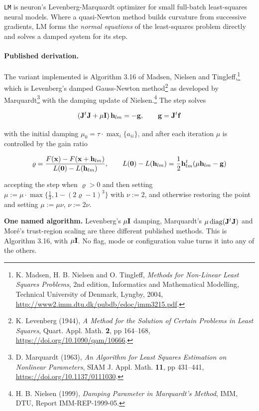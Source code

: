 \texttt{LM} is neuron's Levenberg-Marquardt optimizer for small full-batch
least-squares neural models.  Where a quasi-Newton method builds curvature from
successive gradients, LM forms the {\em normal equations} of the least-squares
problem directly and solves a damped system for its step.

\paragraph{Published derivation.}  The variant implemented is Algorithm 3.16 of
Madsen, Nielsen and Tingleff,\footnote{K. Madsen, H. B. Nielsen and O. Tingleff,
{\em Methods for Non-Linear Least Squares Problems}, 2nd edition, Informatics and
Mathematical Modelling, Technical University of Denmark, Lyngby, 2004,
\url{http://www2.imm.dtu.dk/pubdb/edoc/imm3215.pdf}.}
 which is Levenberg's
damped Gauss-Newton method\footnote{K. Levenberg (1944), {\em A Method for the
Solution of Certain Problems in Least Squares}, Quart. Appl. Math. {\bf 2}, pp
164--168, \url{https://doi.org/10.1090/qam/10666}.} as developed by
Marquardt\footnote{D. Marquardt (1963), {\em An
Algorithm for Least Squares Estimation on Nonlinear Parameters}, SIAM J. Appl.
Math. {\bf 11}, pp 431--441,
\url{https://doi.org/10.1137/0111030}.} with the damping update of
Nielsen.\footnote{H. B. Nielsen (1999), {\em Damping Parameter in Marquardt's
Method}, IMM, DTU, Report IMM-REP-1999-05.}  The step solves

\[
( {\bf J}^t{\bf J} + \mu{\bf I} )\, {\bf h}_{lm} = -{\bf g},
\qquad {\bf g} = {\bf J}^t{\bf f}
\]

with the initial damping $\mu_0 = \tau \cdot \max_i\{a_{ii}\}$, and after each
iteration $\mu$ is controlled by the gain ratio

\[
\varrho = \frac{F({\bf x}) - F({\bf x}+{\bf h}_{lm})}{L({\bf 0}) - L({\bf h}_{lm})},
\qquad
L({\bf 0}) - L({\bf h}_{lm}) = \frac{1}{2}{\bf h}_{lm}^t(\mu{\bf h}_{lm} - {\bf g})
\]

accepting the step when $\varrho > 0$ and then setting
$\mu := \mu \cdot \max\{\frac{1}{3}, 1-(2\varrho-1)^3\}$ with $\nu := 2$, and
otherwise restoring the point and setting $\mu := \mu\nu$, $\nu := 2\nu$.

{\bf One named algorithm.}  Levenberg's $\mu{\bf I}$ damping, Marquardt's
$\mu\,\mathrm{diag}({\bf J}^t{\bf J})$ and Mor\'e's trust-region scaling are
three different published methods.  This is Algorithm 3.16, with $\mu{\bf I}$.
No flag, mode or configuration value turns it into any of the others.

